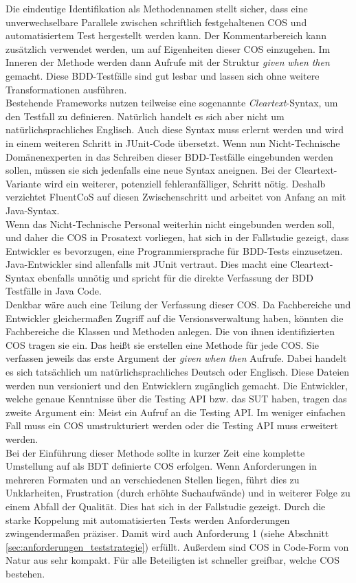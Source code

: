 Die eindeutige Identifikation als Methodennamen stellt sicher, dass eine unverwechselbare Parallele zwischen schriftlich festgehaltenen \Gls{COS} und automatisiertem Test hergestellt werden kann. Der Kommentarbereich kann zusätzlich verwendet werden, um auf Eigenheiten dieser \Gls{COS} einzugehen. Im Inneren der Methode werden dann Aufrufe mit der Struktur \textit{given} \textit{when} \textit{then} gemacht. Diese \Gls{BDD}-Testfälle sind gut lesbar und lassen sich ohne weitere Transformationen ausführen.\\
Bestehende Frameworks nutzen teilweise eine sogenannte \textit{Cleartext}-Syntax, um den Testfall zu definieren. Natürlich handelt es sich aber nicht um natürlichsprachliches Englisch. Auch diese Syntax muss erlernt werden und wird in einem weiteren Schritt in JUnit-Code übersetzt. Wenn nun Nicht-Technische Domänenexperten in das Schreiben dieser BDD-Testfälle eingebunden werden sollen, müssen sie sich jedenfalls eine neue Syntax aneignen. Bei der Cleartext-Variante wird ein weiterer, potenziell fehleranfälliger, Schritt nötig. Deshalb verzichtet FluentCoS auf diesen Zwischenschritt und arbeitet von Anfang an mit Java-Syntax.\\
Wenn das Nicht-Technische Personal weiterhin nicht eingebunden werden soll, und daher die \Gls{COS} in Prosatext vorliegen, hat sich in der Fallstudie gezeigt, dass Entwickler es bevorzugen, eine Programmiersprache für \Gls{BDD}-Tests einzusetzen. Java-Entwickler sind allenfalls mit JUnit vertraut. Dies macht eine Cleartext-Syntax ebenfalls unnötig und spricht für die direkte Verfassung der \Gls{BDD} Testfälle in Java Code.\\
Denkbar wäre auch eine Teilung der Verfassung dieser \Gls{COS}. Da Fachbereiche und Entwickler gleichermaßen Zugriff auf die Versionsverwaltung haben, könnten die Fachbereiche die Klassen und Methoden anlegen. Die von ihnen identifizierten \Gls{COS} tragen sie ein. Das heißt sie erstellen eine Methode für jede \Gls{COS}. Sie verfassen jeweils das erste Argument der \textit{given} \textit{when} \textit{then} Aufrufe. Dabei handelt es sich tatsächlich um natürlichsprachliches Deutsch oder Englisch. Diese Dateien werden nun versioniert und den Entwicklern zugänglich gemacht. Die Entwickler, welche genaue Kenntnisse über die Testing API bzw. das \Gls{SUT} haben, tragen das zweite Argument ein: Meist ein Aufruf an die Testing API. Im weniger einfachen Fall muss ein \Gls{COS} umstrukturiert werden oder die Testing API muss erweitert werden.\\
Bei der Einführung dieser Methode sollte in kurzer Zeit eine komplette Umstellung auf als \Gls{BDT} definierte \Gls{COS} erfolgen. Wenn Anforderungen in mehreren Formaten und an verschiedenen Stellen liegen, führt dies zu Unklarheiten, Frustration (durch erhöhte Suchaufwände) und in weiterer Folge zu einem Abfall der Qualität. Dies hat sich in der Fallstudie gezeigt. Durch die starke Koppelung mit automatisierten Tests werden Anforderungen zwingendermaßen präziser. Damit wird auch Anforderung 1 (siehe Abschnitt \ref{sec:anforderungen_teststrategie}) erfüllt. Außerdem sind \Gls{COS} in Code-Form von Natur aus sehr kompakt. Für alle Beteiligten ist schneller greifbar, welche \Gls{COS} bestehen.\\

